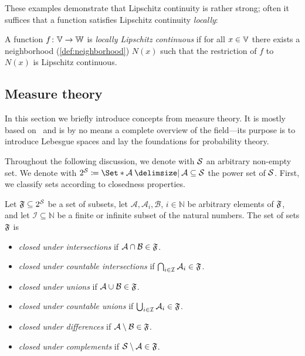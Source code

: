 These examples demonstrate that Lipschitz continuity is rather strong;
often it suffices that a function satisfies Lipschitz continuity \emph{locally}:
\begin{definition}%
	\label{def:local lipschitz continuity}
	A function \( f \colon \mathbb{V} \to \mathbb{W} \) is \emph{locally Lipschitz continuous} if for all \( x \in \mathbb{V} \) there exists a neighborhood (\cref{def:neighborhood}) \( N(x) \) such that the restriction of \( f \) to \( N(x) \) is Lipschitz continuous.
\end{definition}
\subsection{Measure theory}
In this section we briefly introduce concepts from measure theory.
It is mostly based on~\cite{bredies_mathematical_2018} and is by no means a complete overview of the field---its purpose is to introduce Lebesgue spaces and lay the foundations for probability theory.

Throughout the following discussion, we denote with \( \mathcal{S} \) an arbitrary non-empty set.
We denote with \( \PowerSet{\ASet} \coloneqq \Set*{\mathcal{A} \given \mathcal{A} \subseteq \ASet} \) the power set of \( \mathcal{S} \).
First, we classify sets according to closedness properties.
\begin{definition}
	Let \( \mathfrak{F} \subseteq 2^{\mathcal{S}}\) be a set of subsets, let \( \mathcal{A}, \mathcal{A}_i, \mathcal{B} \), \( i \in \mathbb{N} \) be arbitrary elements of \( \mathfrak{F} \), and let \( \mathcal{I} \subseteq \mathbb{N} \) be a finite or infinite subset of the natural numbers.
	The set of sets \( \mathfrak{F} \) is
	\begin{itemize}
		\item \emph{closed under intersections} if \( \mathcal{A} \cap \mathcal{B} \in \mathfrak{F} \).
		\item \emph{closed under countable intersections} if \( \bigcap_{i \in \mathcal{I}}\mathcal{A}_i \in \mathfrak{F} \).
		\item \emph{closed under unions} if \( \mathcal{A} \cup \mathcal{B} \in \mathfrak{F} \).
		\item \emph{closed under countable unions} if \( \bigcup_{i \in \mathcal{I}}\mathcal{A}_i \in \mathfrak{F} \).
		\item \emph{closed under differences} if \( \mathcal{A} \setminus \mathcal{B} \in \mathfrak{F} \).
		\item \emph{closed under complements} if \( \mathcal{S} \setminus \mathcal{A} \in \mathfrak{F} \).
	\end{itemize}
\end{definition}

